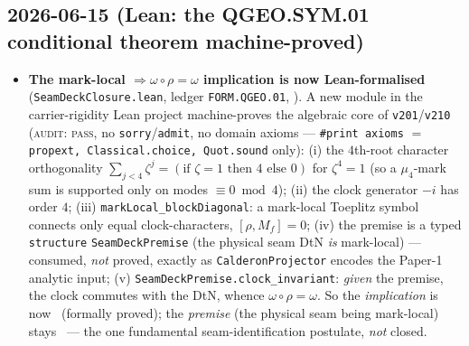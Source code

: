 \subsection*{2026-06-15 (Lean: the QGEO.SYM.01 conditional theorem machine-proved)}
\begin{itemize}
\item \textbf{The mark-local $\Rightarrow\omega\circ\rho=\omega$ implication is now Lean-formalised}
  (\texttt{SeamDeckClosure.lean}, ledger \texttt{FORM.QGEO.01}, \mO). A new module in the
  carrier-rigidity Lean project machine-proves the algebraic core of \texttt{v201}/\texttt{v210}
  (\textsc{audit: pass}, no \texttt{sorry}/\texttt{admit}, no domain axioms --- \texttt{\#print axioms} $=$
  \texttt{propext, Classical.choice, Quot.sound} only): (i) the $4$th-root character orthogonality
  $\sum_{j<4}\zeta^j=(\text{if }\zeta{=}1\text{ then }4\text{ else }0)$ for $\zeta^4{=}1$ (so a $\mu_4$-mark
  sum is supported only on modes $\equiv0\bmod4$); (ii) the clock generator $-i$ has order $4$;
  (iii) \texttt{markLocal\_blockDiagonal}: a mark-local Toeplitz symbol connects only equal clock-characters,
  $[\rho,M_f]=0$; (iv) the premise is a typed \texttt{structure} \texttt{SeamDeckPremise} (the physical seam
  DtN \emph{is} mark-local) --- consumed, \emph{not} proved, exactly as \texttt{CalderonProjector} encodes the
  Paper-1 analytic input; (v) \texttt{SeamDeckPremise.clock\_invariant}: \emph{given} the premise, the clock
  commutes with the DtN, whence $\omega\circ\rho=\omega$. So the \emph{implication} is now \mE\ (formally
  proved); the \emph{premise} (the physical seam being mark-local) stays \mO\ --- the one fundamental
  seam-identification postulate, \emph{not} closed.
\end{itemize}

